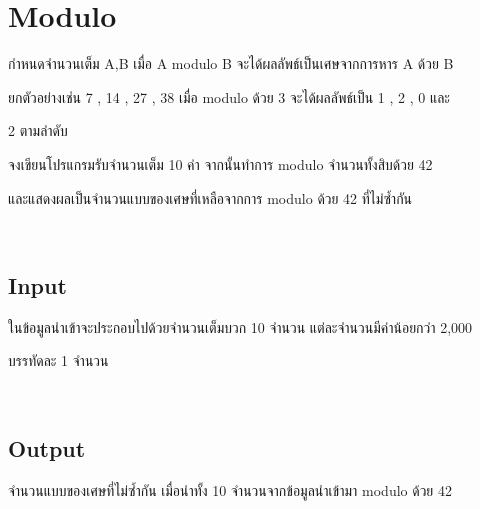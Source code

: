\documentclass{article}
\begin{document}
\section*{Modulo}

{กำหนดจำนวนเต็ม A,B เมื่อ A modulo B จะได้ผลลัพธ์เป็นเศษจากการหาร A ด้วย B

ยกตัวอย่างเช่น 7 , 14 , 27 , 38 เมื่อ modulo ด้วย 3 จะได้ผลลัพธ์เป็น 1 , 2 , 0 และ

2 ตามลำดับ}



{จงเขียนโปรแกรมรับจำนวนเต็ม 10 ค่า จากนั้นทำการ modulo จำนวนทั้งสิบด้วย 42

และแสดงผลเป็นจำนวนแบบของเศษที่เหลือจากการ modulo ด้วย 42 ที่ไม่ซ้ำกัน}\\



\subsection*{Input}
{ในข้อมูลนำเข้าจะประกอบไปด้วยจำนวนเต็มบวก 10 จำนวน แต่ละจำนวนมีค่าน้อยกว่า 2,000

บรรทัดละ 1 จำนวน}\\



\subsection*{Output}
{จำนวนแบบของเศษที่ไม่ซ้ำกัน เมื่อนำทั้ง 10 จำนวนจากข้อมูลนำเข้ามา modulo ด้วย 42}\\
\end{document}
